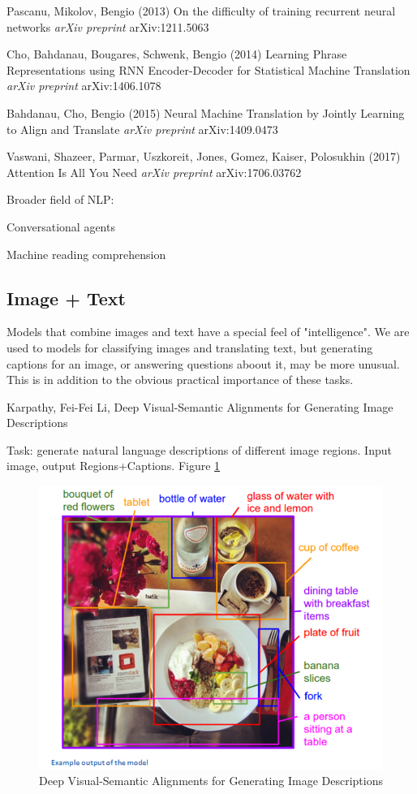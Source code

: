 \documentclass[english]{article}
\begin{document}
Pascanu, Mikolov, Bengio (2013) {On the difficulty of training recurrent neural networks}
 {\emph{arXiv preprint} arXiv:1211.5063}
 
Cho, Bahdanau, Bougares, Schwenk, Bengio (2014)
  {
  Learning Phrase Representations using RNN Encoder-Decoder for Statistical Machine Translation}
  {\emph{arXiv preprint} arXiv:1406.1078}
 
Bahdanau, Cho, Bengio (2015)
  {Neural Machine Translation by Jointly Learning to Align and Translate}
 {\emph{arXiv preprint} arXiv:1409.0473}
 
 Vaswani, Shazeer, Parmar, Uszkoreit, Jones, Gomez, Kaiser, Polosukhin (2017)
 {Attention Is All You Need}
 {\emph{arXiv preprint} arXiv:1706.03762}


\item Broader field of NLP: 

Conversational agents

Machine reading comprehension

\eenum

\subsection{Image + Text}


\benum
\item Models that combine images and text have a special feel of "intelligence". We are used to models for classifying images and translating text, but generating captions for an image, or answering questions aboout it, may be more unusual. This is in addition to the obvious practical importance of these tasks. 

\item 
Karpathy, Fei-Fei Li, Deep Visual-Semantic Alignments for Generating Image Descriptions
\benum 
\item Task: generate natural language descriptions of different image regions. Input image, output Regions+Captions. Figure \ref{Caption}

\begin{figure}
  \centering
  \includegraphics[scale=0.5]{Caption.png}
    \caption{Deep Visual-Semantic Alignments for Generating Image Descriptions}
    \label{Caption}
\end{figure}
\end{document}
